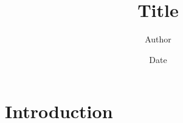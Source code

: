 \documentclass[12pt]{article}%
\title{Title} %
\author{Author} %
\date{Date} %
\theoremstyle{definition}
\theoremstyle{remark}
\theoremstyle{definition}
\theoremstyle{definition}
\begin{document}
\maketitle %

\noindent %

\tableofcontents %

\section{Introduction} 
\end{document}
